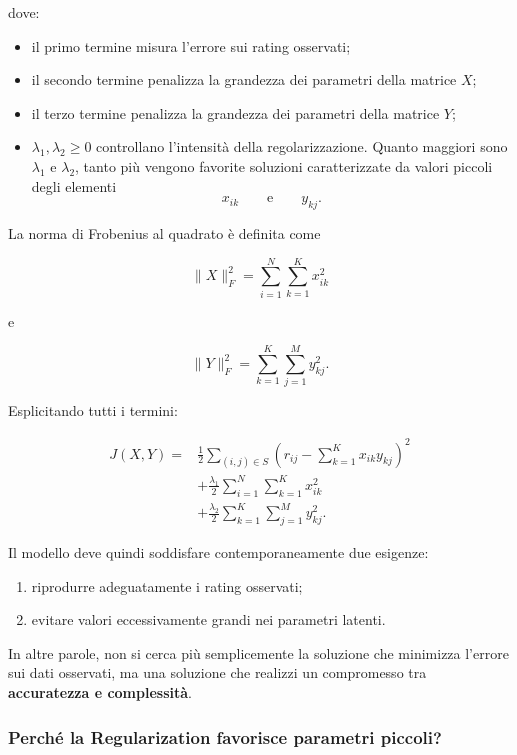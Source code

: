 dove:

\begin{itemize}
    \item il primo termine misura l'errore sui rating
    osservati;

    \item il secondo termine penalizza la grandezza
    dei parametri della matrice $X$;

    \item il terzo termine penalizza la grandezza
    dei parametri della matrice $Y$;

    \item $\lambda_1,\lambda_2\geq 0$ controllano
    l'intensità della regolarizzazione.
    Quanto maggiori sono $\lambda_1$ e $\lambda_2$, tanto più vengono favorite soluzioni caratterizzate da valori piccoli degli elementi
    \[
    x_{ik}
    \qquad\text{e}\qquad
    y_{kj}.
    \]
\end{itemize}

La norma di Frobenius al quadrato è definita come

\[
\|X\|_F^2
=
\sum_{i=1}^{N}
\sum_{k=1}^{K}
x_{ik}^{2}
\]

e

\[
\|Y\|_F^2
=
\sum_{k=1}^{K}
\sum_{j=1}^{M}
y_{kj}^{2}.
\]

Esplicitando tutti i termini:

\[
\begin{aligned}
J(X,Y)
={}&
\frac{1}{2}
\sum_{(i,j)\in S}
\left(
r_{ij}
-
\sum_{k=1}^{K}x_{ik}y_{kj}
\right)^2\\
&+
\frac{\lambda_1}{2}
\sum_{i=1}^{N}
\sum_{k=1}^{K}x_{ik}^{2}\\
&+
\frac{\lambda_2}{2}
\sum_{k=1}^{K}
\sum_{j=1}^{M}y_{kj}^{2}.
\end{aligned}
\]

Il modello deve quindi soddisfare contemporaneamente
due esigenze:

\begin{enumerate}
    \item riprodurre adeguatamente i rating osservati;
    \item evitare valori eccessivamente grandi nei parametri
    latenti.
\end{enumerate}

In altre parole, non si cerca più semplicemente
la soluzione che minimizza l'errore sui dati osservati,
ma una soluzione che realizzi un compromesso tra
\textbf{accuratezza e complessità}.

\subsubsection{Perché la Regularization favorisce parametri piccoli?}

